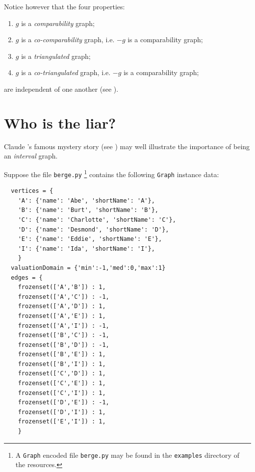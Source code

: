 Notice however that the four properties:
\begin{enumerate}
\item $g$ is a \emph{comparability} graph;
\item $g$ is a \emph{co-comparability} graph, i.e. $-g$ is a comparability graph;
\item $g$ is a \emph{triangulated} graph;
\item $g$ is a \emph{co-triangulated} graph, i.e. $-g$ is a comparability graph;
\end{enumerate}
are independent of one another (see \citet[p. 275]{GOL-2004}).

\section{Who is the liar?}
\label{sec:25.2}


Claude \Berge's famous mystery story (see \citet[p. 20]{GOL-2004}) may well illustrate the importance of being an \emph{interval} graph.

Suppose the file \texttt{berge.py} \footnote{A \texttt{Graph} encoded file \texttt{berge.py} may be found in the \texttt{examples} directory of the \Digraph resources.} contains the following \texttt{Graph} instance data:
\begin{lstlisting}
  vertices = {
    'A': {'name': 'Abe', 'shortName': 'A'},
    'B': {'name': 'Burt', 'shortName': 'B'},
    'C': {'name': 'Charlotte', 'shortName': 'C'},
    'D': {'name': 'Desmond', 'shortName': 'D'},
    'E': {'name': 'Eddie', 'shortName': 'E'},
    'I': {'name': 'Ida', 'shortName': 'I'},
    }
  valuationDomain = {'min':-1,'med':0,'max':1}
  edges = {
    frozenset(['A','B']) : 1, 
    frozenset(['A','C']) : -1, 
    frozenset(['A','D']) : 1, 
    frozenset(['A','E']) : 1, 
    frozenset(['A','I']) : -1, 
    frozenset(['B','C']) : -1, 
    frozenset(['B','D']) : -1, 
    frozenset(['B','E']) : 1, 
    frozenset(['B','I']) : 1, 
    frozenset(['C','D']) : 1, 
    frozenset(['C','E']) : 1, 
    frozenset(['C','I']) : 1, 
    frozenset(['D','E']) : -1, 
    frozenset(['D','I']) : 1, 
    frozenset(['E','I']) : 1, 
    }
\end{lstlisting}

